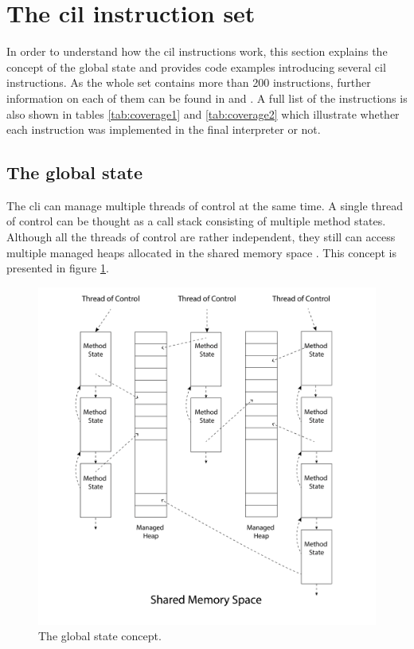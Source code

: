 \documentclass{article}
\numberwithin{equation}{section}
\begin{document}
\section{The \acrshort{cil} instruction set}

In order to understand how the \acrshort{cil} instructions work, this section explains the concept of the global state and provides code examples introducing several \acrshort{cil} instructions. As the whole set contains more than 200 instructions, further information on each of them can be found in \cite{ecmaStandard} and \cite{isoStandard}. A full list of the instructions is also shown in tables \ref{tab:coverage1} and \ref{tab:coverage2} which illustrate whether each instruction was implemented in the final interpreter or not.

\subsection{The global state}
\label{sec:global_state}

The \acrshort{cli} can manage multiple threads of control at the same time. A single thread of control can be thought as a call stack consisting of multiple method states. Although all the threads of control are rather independent, they still can access multiple managed heaps allocated in the shared memory space \cite{ecmaStandard}. This concept is presented in figure \ref{fig:global_state}.

\begin{figure}
	\includegraphics[width=1\textwidth]{global_state.png}
    \centering
    \caption{The global state concept.}
    \label{fig:global_state}
\end{figure}
\end{document}
